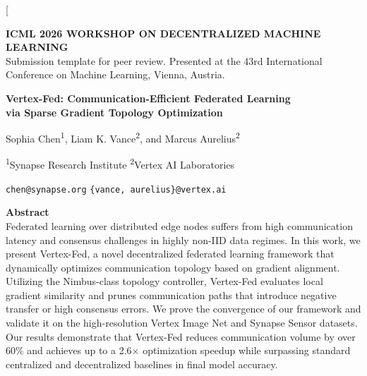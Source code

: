 \documentclass[10pt,twocolumn]{article}
\begin{document}
\noindent{}
\vspace{0.8em}



\twocolumn[{
  \begin{center}
    \begin{tcolorbox}[colback=bglight,colframe=primarycolor,arc=1mm,boxrule=1pt,top=3mm,bottom=3mm,left=4mm,right=4mm,width=\textwidth]
      \centering\small\sffamily\textcolor{primarycolor}{\textbf{ICML 2026 WORKSHOP ON DECENTRALIZED MACHINE LEARNING}} \\
      \vspace{1mm}
      \textcolor{secondarycolor}{Submission template for peer review. Presented at the 43rd International Conference on Machine Learning, Vienna, Austria.}
    \end{tcolorbox}
    \vspace{0.6cm}
    {\LARGE\bfseries\color{primarycolor} Vertex-Fed: Communication-Efficient Federated Learning\\ via Sparse Gradient Topology Optimization \par}
    \vspace{0.6cm}
    {\large Sophia Chen\textsuperscript{1}, Liam K. Vance\textsuperscript{2}, and Marcus Aurelius\textsuperscript{2} \par}
    \vspace{0.3cm}
    {\small \textsuperscript{1}Synapse Research Institute \quad \textsuperscript{2}Vertex AI Laboratories \par}
    {\small \texttt{chen@synapse.org} \quad \texttt{\{vance, aurelius\}@vertex.ai} \par}
    \vspace{0.6cm}
    \begin{minipage}{0.88\textwidth}
      \small
      \textbf{Abstract} \\
      Federated learning over distributed edge nodes suffers from high communication latency and consensus challenges in highly non-IID data regimes. In this work, we present Vertex-Fed, a novel decentralized federated learning framework that dynamically optimizes communication topology based on gradient alignment. Utilizing the Nimbus-class topology controller, Vertex-Fed evaluates local gradient similarity and prunes communication paths that introduce negative transfer or high consensus errors. We prove the convergence of our framework and validate it on the high-resolution Vertex Image Net and Synapse Sensor datasets. Our results demonstrate that Vertex-Fed reduces communication volume by over 60\% and achieves up to a 2.6$\times$ optimization speedup while surpassing standard centralized and decentralized baselines in final model accuracy.

\end{minipage}
\end{center}}
\end{document}
